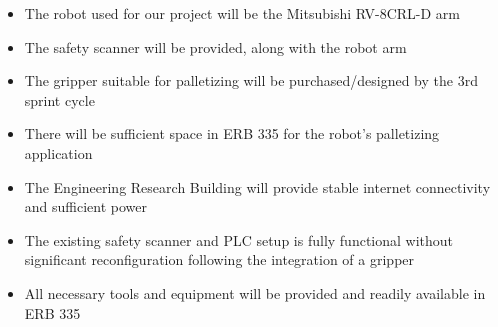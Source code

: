 \begin{itemize}
  \item The robot used for our project will be the Mitsubishi RV-8CRL-D arm
  \item The safety scanner will be provided, along with the robot arm
  \item The gripper suitable for palletizing will be purchased/designed by the 3rd sprint cycle 
  \item There will be sufficient space in ERB 335 for the robot's palletizing application
  \item The Engineering Research Building will provide stable internet connectivity and sufficient power 
  \item The existing safety scanner and PLC setup is fully functional without significant reconfiguration following the integration of a gripper
  \item All necessary tools and equipment will be provided and readily available in ERB 335
\end{itemize}